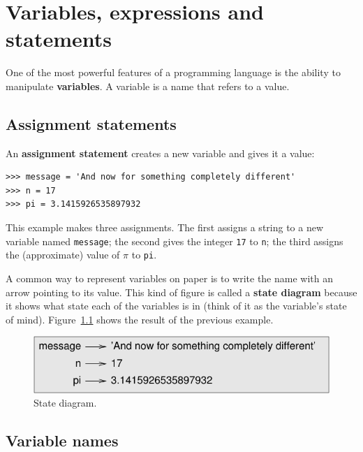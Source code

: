 \documentclass[10pt]{book}
\begin{document}
\chapter{Variables, expressions and statements}

One of the most powerful features of a programming language is the
ability to manipulate {\bf variables}.  A variable is a name that
refers to a value.


\section{Assignment statements}
\label{variables}

An {\bf assignment statement} creates a new variable and gives
it a value:

\begin{verbatim}
>>> message = 'And now for something completely different'
>>> n = 17
>>> pi = 3.1415926535897932
\end{verbatim}
%
This example makes three assignments.  The first assigns a string
to a new variable named {\tt message};
the second gives the integer {\tt 17} to {\tt n}; the third
assigns the (approximate) value of $\pi$ to {\tt pi}.

A common way to represent variables on paper is to write the name with
an arrow pointing to its value.  This kind of figure is
called a {\bf state diagram} because it shows what state each of the
variables is in (think of it as the variable's state of mind).
Figure~\ref{fig.state2} shows the result of the previous example.

\begin{figure}
\centerline
{\includegraphics[scale=0.8]{figs/state2.pdf}}
\caption{State diagram.}
\label{fig.state2}
\end{figure}



\section{Variable names}
\end{document}
